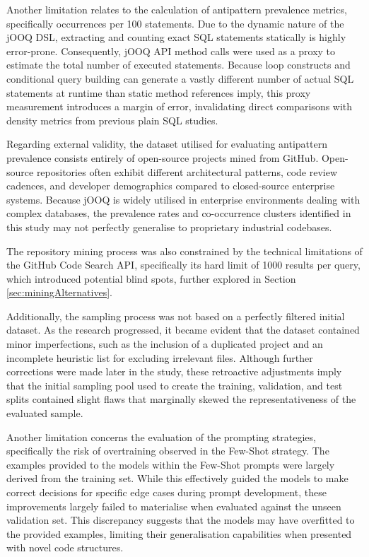 Another limitation relates to the calculation of antipattern prevalence metrics, specifically occurrences per \num{100} statements. Due to the dynamic nature of the jOOQ DSL, extracting and counting exact SQL statements statically is highly error-prone. Consequently, jOOQ API method calls were used as a proxy to estimate the total number of executed statements. Because loop constructs and conditional query building can generate a vastly different number of actual SQL statements at runtime than static method references imply, this proxy measurement introduces a margin of error, invalidating direct comparisons with density metrics from previous plain SQL studies.

Regarding external validity, the dataset utilised for evaluating antipattern prevalence consists entirely of open-source projects mined from GitHub. Open-source repositories often exhibit different architectural patterns, code review cadences, and developer demographics compared to closed-source enterprise systems. Because jOOQ is widely utilised in enterprise environments dealing with complex databases, the prevalence rates and co-occurrence clusters identified in this study may not perfectly generalise to proprietary industrial codebases.

The repository mining process was also constrained by the technical limitations of the GitHub Code Search API, specifically its hard limit of \num{1000} results per query, which introduced potential blind spots, further explored in Section \ref{sec:miningAlternatives}.

Additionally, the sampling process was not based on a perfectly filtered initial dataset. As the research progressed, it became evident that the dataset contained minor imperfections, such as the inclusion of a duplicated project and an incomplete heuristic list for excluding irrelevant files. Although further corrections were made later in the study, these retroactive adjustments imply that the initial sampling pool used to create the training, validation, and test splits contained slight flaws that marginally skewed the representativeness of the evaluated sample.

Another limitation concerns the evaluation of the prompting strategies, specifically the risk of overtraining observed in the Few-Shot strategy. The examples provided to the models within the Few-Shot prompts were largely derived from the training set. While this effectively guided the models to make correct decisions for specific edge cases during prompt development, these improvements largely failed to materialise when evaluated against the unseen validation set. This discrepancy suggests that the models may have overfitted to the provided examples, limiting their generalisation capabilities when presented with novel code structures.

